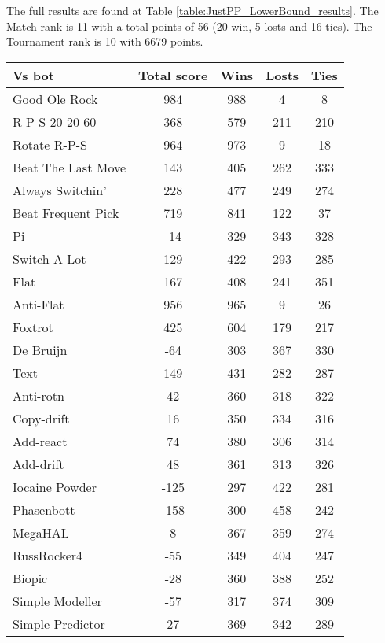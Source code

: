 The full results are found at Table \ref{table:JustPP_LowerBound_results}. The Match rank is 11 with a total points of 56 (20 win, 5 losts and 16 ties). The Tournament rank is 10 with 6679 points.

\begin{table*}
    \caption{JustPP_LowerBound results}
    \label{table:JustPP_LowerBound_results}
    \centering
    \begin{tabular}{|l|c|c|c|c|}
        \hline
        \textbf{Vs bot} & \textbf{Total score} & \textbf{Wins} & \textbf{Losts} & \textbf{Ties} \\ \hline
Good Ole Rock & 984 & 988 & 4 & 8 \\ \hline 
R-P-S 20-20-60 & 368 & 579 & 211 & 210 \\ \hline 
Rotate R-P-S & 964 & 973 & 9 & 18 \\ \hline 
Beat The Last Move & 143 & 405 & 262 & 333 \\ \hline 
Always Switchin' & 228 & 477 & 249 & 274 \\ \hline 
Beat Frequent Pick & 719 & 841 & 122 & 37 \\ \hline 
Pi & -14 & 329 & 343 & 328 \\ \hline 
Switch A Lot & 129 & 422 & 293 & 285 \\ \hline 
Flat & 167 & 408 & 241 & 351 \\ \hline 
Anti-Flat & 956 & 965 & 9 & 26 \\ \hline 
Foxtrot & 425 & 604 & 179 & 217 \\ \hline 
De Bruijn & -64 & 303 & 367 & 330 \\ \hline 
Text & 149 & 431 & 282 & 287 \\ \hline 
Anti-rotn & 42 & 360 & 318 & 322 \\ \hline 
Copy-drift & 16 & 350 & 334 & 316 \\ \hline 
Add-react & 74 & 380 & 306 & 314 \\ \hline 
Add-drift & 48 & 361 & 313 & 326 \\ \hline 
Iocaine Powder & -125 & 297 & 422 & 281 \\ \hline 
Phasenbott & -158 & 300 & 458 & 242 \\ \hline 
MegaHAL & 8 & 367 & 359 & 274 \\ \hline 
RussRocker4 & -55 & 349 & 404 & 247 \\ \hline 
Biopic & -28 & 360 & 388 & 252 \\ \hline 
Simple Modeller & -57 & 317 & 374 & 309 \\ \hline 
Simple Predictor & 27 & 369 & 342 & 289 \\ \hline 

\end{tabular}
\end{table*}
